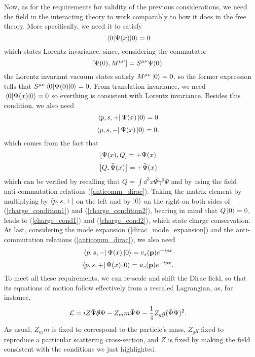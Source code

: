 Now, as for the requirements for validity of the previous considerations,  we need the field in the interacting theory to work comparably to how it does in the free theory. More specifically, we need it to satisfy
\begin{equation}
    \vev{\Psi(x)}=0
\end{equation}
which states Lorentz invariance, since, considering the commutator
\begin{equation}
    \comm{\Psi(0)}{M^{\mu\nu}}=S^{\mu\nu}\Psi(0).
\end{equation}
the Lorentz invariant vacuum states satisfy $M^{\mu\nu}\ket{0}=0$, so the former expression tells that $S^{\mu\nu}\vev{\Psi(0)}=0$. From translation invariance, we need $\vev{\Psi(x)}=0$ so everthing is consistent with Lorentz invariance. Besides this condition, we also need
\begin{equation}
    \bra{p,s,+}\Psi(x)\ket{0}=0
    \label{charge_cond1}
\end{equation}
\begin{equation}
    \bra{p,s,-}\bar{\Psi}(x)\ket{0}=0.
    \label{charge_cond2}
\end{equation}
which comes from the fact that
\begin{equation}
    \comm{\Psi(x)}{Q}=+\Psi(x)
    \label{charge_condition1}
\end{equation}
\begin{equation}
    \comm{Q}{\bar{\Psi}(x)}=+\bar{\Psi}(x)
    \label{charge_condition2}
\end{equation}
which can be verified by recalling that $Q=\int\dd^3 x \bar{\Psi}\gamma^0\Psi$ and by using the field anti-commutation relations (\ref{anticomm_dirac}). Taking the matrix element by multiplying by $\bra{p,s,\pm}$ on the left and by $\ket{0}$ on the right on both sides of (\ref{charge_condition1}) and (\ref{charge_condition2}), bearing in mind that $Q\ket{0}=0$, leads to (\ref{charge_cond1}) and (\ref{charge_cond2}), which state charge conservation. At last, considering the mode expansion (\ref{dirac_mode_expansion}) and the anti-commutation relations (\ref{anticomm_dirac}), we also need 
\begin{equation}
    \bra{p,s,-}\Psi(x)\ket{0}=v_s(\vb{p})e^{-ipx}
\end{equation}
\begin{equation}
    \bra{p,s,+}\bar{\Psi}(x)\ket{0}=\bar{u}_s(\vb{p})e^{-ipx}.
\end{equation}
To meet all these requirements, we can re-scale and shift the Dirac field, so that its equations of motion follow effectively from a rescaled Lagrangian, as, for instance,
\begin{equation}
    \mathcal{L}=iZ\bar{\Psi}\slashed{\partial}\Psi-Z_mm\bar{\Psi}\Psi-\frac{1}{4}Z_gg(\bar{\Psi}\Psi)^2.
\end{equation}
As usual, $Z_mm$ is fixed to correspond to the particle's mass, $Z_g g$ fixed to reproduce a particular scattering cross-section, and $Z$ is fixed by making the field consistent with the conditions we just highlighted.
